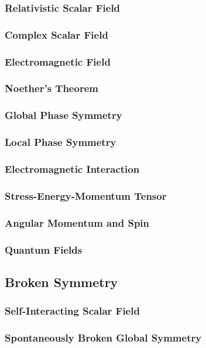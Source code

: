 \documentclass[a4paper]{article}
\theoremstyle{new}
\begin{document}
\subsubsection{Relativistic Scalar Field}
\newpage
\subsubsection{Complex Scalar Field}
\subsubsection{Electromagnetic Field}
\newpage
\subsubsection{Noether's Theorem}
\subsubsection{Global Phase Symmetry}
\subsubsection{Local Phase Symmetry}
\subsubsection{Electromagnetic Interaction}
\subsubsection{Stress-Energy-Momentum Tensor}
\subsubsection{Angular Momentum and Spin}
\newpage
\subsubsection{Quantum Fields}
\newpage
\subsection{Broken Symmetry}
\subsubsection{Self-Interacting Scalar Field}
\subsubsection{Spontaneously Broken Global Symmetry}
\end{document}
